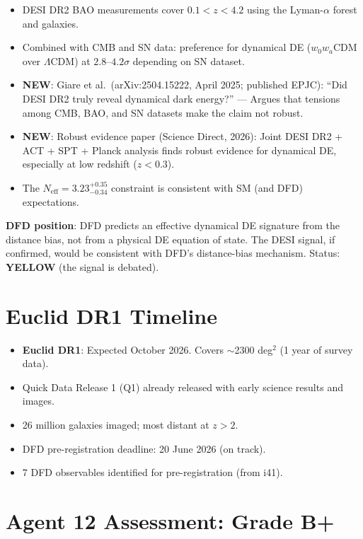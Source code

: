 \documentclass[11pt,a4paper]{article}
\newcommand{\YELLOW}{\textcolor{dfdyellow}{\textbf{YELLOW}}}
\newcommand{\NEW}{\textcolor{dfdblue}{\textbf{NEW}}}
\begin{document}
\begin{itemize}
\item DESI DR2 BAO measurements cover $0.1 < z < 4.2$ using the Lyman-$\alpha$ forest and galaxies.
\item Combined with CMB and SN data: preference for dynamical DE ($w_0w_a$CDM over $\Lambda$CDM) at $2.8$--$4.2\sigma$ depending on SN dataset.
\item \NEW: Giare et al.\ (arXiv:2504.15222, April 2025; published EPJC): ``Did DESI DR2 truly reveal dynamical dark energy?'' --- Argues that tensions among CMB, BAO, and SN datasets make the claim not robust.
\item \NEW: Robust evidence paper (Science Direct, 2026): Joint DESI DR2 + ACT + SPT + Planck analysis finds robust evidence for dynamical DE, especially at low redshift ($z < 0.3$).
\item The $N_{\text{eff}} = 3.23^{+0.35}_{-0.34}$ constraint is consistent with SM (and DFD) expectations.
\end{itemize}

\textbf{DFD position}: DFD predicts an effective dynamical DE signature from the distance bias, not from a physical DE equation of state. The DESI signal, if confirmed, would be consistent with DFD's distance-bias mechanism. Status: \YELLOW{} (the signal is debated).

\section{Euclid DR1 Timeline}

\begin{itemize}
\item \textbf{Euclid DR1}: Expected October 2026. Covers $\sim$2300 deg$^2$ (1 year of survey data).
\item Quick Data Release 1 (Q1) already released with early science results and images.
\item 26 million galaxies imaged; most distant at $z > 2$.
\item DFD pre-registration deadline: 20 June 2026 (on track).
\item 7 DFD observables identified for pre-registration (from i41).
\end{itemize}

\section{Agent 12 Assessment: Grade B+}
\end{document}
